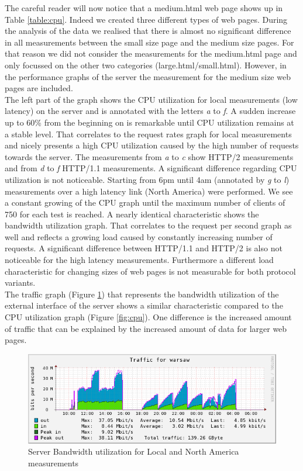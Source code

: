 The careful reader will now  notice that a medium.html web page shows up in Table \ref{table:cpu}. Indeed we created three different types of web pages. During the analysis of the data we realised that there is almost no significant difference in all measurements between the small size page and the medium size pages. For that reason we did not consider the measurements for the medium.html page and only focussed on the other two categories (large.html/small.html). However, in the performance graphs of the server the measurement for the medium size web pages are included.
\\ 
The left part of the graph shows the CPU utilization for local measurements (low latency) on the server and is annotated with the letters \textit{a} to \textit{f}. A sudden increase up to 60\% from the beginning on is remarkable until CPU utilization remains at a stable level. That correlates to the request rates graph for local measurements and nicely presents a high CPU utilization caused by the high number of requests towards the server. The measurements from \textit{a} to \textit{c} show HTTP/2 measurements and from \textit{d} to \textit{f} HTTP/1.1 measurements. A significant difference regarding CPU utilization is not noticeable. Starting from 6pm until 4am (annotated by \textit{g} to \textit{l}) measurements over a high latency link (North America) were performed. We see a constant growing of the CPU graph until the maximum number of clients of 750 for each test is reached. A nearly identical characteristic shows the bandwidth utilization graph. That correlates to the request per second graph as well and reflects a growing load caused by constantly increasing number of requests. A significant difference between HTTP/1.1 and HTTP/2 is also not noticeable for the high latency measurements. Furthermore a different load characteristic for changing sizes of web pages is not measurable for both protocol variants. 
\\
The traffic graph (Figure \ref{fig:network}) that represents the bandwidth utilization of the external interface of the server shows a similar characteristic compared to the CPU utilization graph (Figure \ref{fig:cpu}). One difference is the increased amount of traffic that can be explained by the increased amount of data for larger web pages. 

\begin{figure}[H]
\centering
\includegraphics[scale=0.6,trim=0.0cm .0cm .0cm .0cm,clip]{images/network.png}
\caption{Server Bandwidth utilization for Local and North America measurements}
\label{fig:network}
\end{figure}

